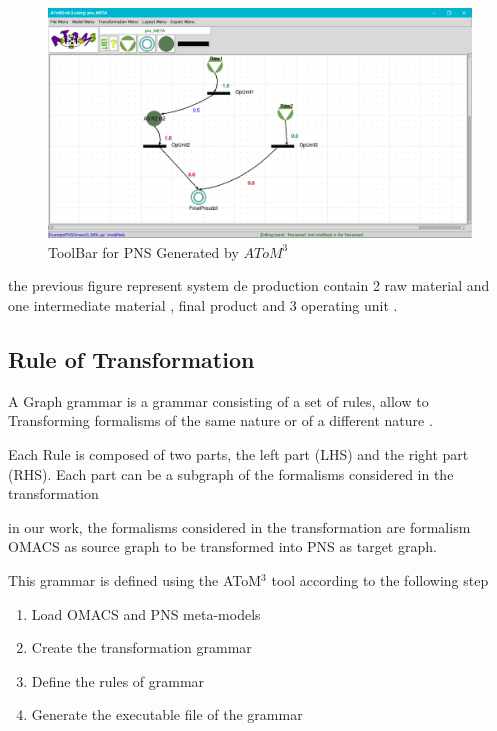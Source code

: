\begin{figure}[th]
	\centering
 	\includegraphics[scale=0.3]{Chapiter3/img/pns_model}
	\caption{\label{fig:PNS Model}ToolBar for PNS Generated by $AToM^3$}
\end{figure} 

the previous figure represent system de production contain 2 raw material and one intermediate material , final product and 3 operating unit .





\pagebreak
\subsection{ Rule of Transformation }
A Graph grammar is a grammar consisting of a set of rules, allow to 
Transforming formalisms of the same nature or of a different nature . 

Each Rule is composed of two parts, the left part (LHS) and the right part (RHS).
Each part can be a subgraph of the formalisms considered in the transformation

in our work, the formalisms considered in the transformation are formalism
OMACS as source graph to be transformed into PNS as target graph.

This grammar is defined using the AToM$^3$ tool according to the following step

\begin{enumerate}
	\item Load OMACS and PNS meta-models
	\item Create the transformation grammar
	\item Define the rules of grammar
	\item Generate the executable file of the grammar
\end{enumerate}
 
